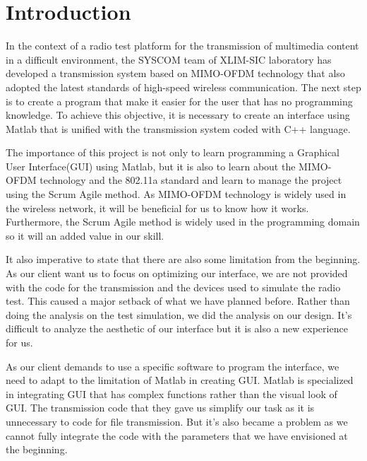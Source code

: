 \section{Introduction}

\par In the context of a radio test platform for the transmission of multimedia content in a difficult environment, the SYSCOM team of XLIM-SIC laboratory has developed a transmission system based on MIMO-OFDM technology that also adopted the latest standards of high-speed wireless communication. The next step is to create a program that make it easier for the user that has no programming knowledge. To achieve this objective, it is necessary to create an interface using Matlab that is unified with the transmission system coded with C++ language. 

\par \vspace{0.25cm}The importance of this project is not only to learn programming a Graphical User Interface(GUI) using Matlab, but it is also to learn about the MIMO-OFDM technology and the 802.11a standard and learn to manage the project using the Scrum Agile method. As MIMO-OFDM technology is widely used in the wireless network, it will be beneficial for us to know how it works. Furthermore, the Scrum Agile method is widely used in the programming domain so it will an added value in our skill. 

\par \vspace{0.25cm}It also imperative to state that there are also some limitation from the beginning. As our client want us to focus on optimizing our interface, we are not provided with the code for the transmission and the devices used to simulate the radio test. This caused a major setback of what we have planned before. Rather than doing the analysis on the test simulation, we did the analysis on our design. It's difficult to analyze the aesthetic of our interface but it is also a new experience for us. 

\par \vspace{0.25cm}As our client demands to use a specific software to program the interface, we need to adapt to the limitation of Matlab in creating GUI. Matlab is specialized in integrating GUI that has complex functions rather than the visual look of GUI. The transmission code that they gave us simplify our task as it is unnecessary to code for file transmission. But it's also became a problem as we cannot fully integrate the code with the parameters that we have envisioned at the beginning. 
